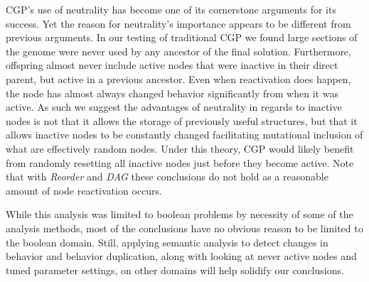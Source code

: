 \documentclass[journal]{IEEEtran}
\begin{document}
CGP's use of neutrality has become one of its cornerstone arguments for its success.
Yet the reason for neutrality's importance appears to be different from previous
arguments.  In our testing of traditional CGP we found large sections of the
genome were never used by any ancestor of the final solution.  Furthermore,
offspring almost never include active nodes that were inactive in their direct
parent, but active in a previous ancestor.  Even when reactivation does happen,
the node has almost always changed behavior significantly from when it was active.
As such we suggest the advantages of neutrality in regards to inactive nodes is
not that it allows the storage of previously useful structures, but that it allows
inactive nodes to be constantly changed facilitating mutational inclusion of what
are effectively random nodes.  Under this theory, CGP would likely benefit from randomly resetting
all inactive nodes just before they become active.  Note that with \emph{Reorder}
and \emph{DAG} these conclusions do not hold as a reasonable amount of node
reactivation occurs.

While this analysis was limited to boolean problems by necessity of some of
the analysis methods, most of the conclusions have no obvious reason to be
limited to the boolean domain.  Still, applying semantic analysis
to detect changes in behavior and behavior duplication, along with looking at
never active nodes and tuned parameter settings, on other domains will help
solidify our conclusions.


%
\end{document}
